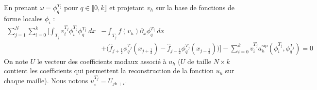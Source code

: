 En prenant $\omega = \phi_q^{T_j}$ pour $q \in \llbracket 0,k \rrbracket$ et projetant $v_h$ sur la base de fonctions de forme locales $\phi_i$ : 
\begin{equation*}
\begin{split}
    \sum_{j=1}^{N}\sum_{i=0}^{k} \bigg[ \int_{T_j} v_i^{T_j} \phi_i^{T_j} \phi_q^{T_j} \ dx &- \int_{T_j} f(v_h) \partial_x \phi_q^{T_j} \ dx  \\
    & + \Big( \widehat{f}_{j+\frac{1}{2}}\phi_q^{T_j}(x_{j + \frac{1}{2}}) - \widehat{f}_{j - \frac{1}{2}} \phi_q^{T_j}(x_{j - \frac{1}{2}}) \Big) \bigg] - \sum_{i=0}^{k} v_i^{T_j}a_h^{\text{sip}} (\phi_i^{T_j} , \phi_q^{T_j} ) = 0
\end{split}
\end{equation*}
On note $U$ le vecteur des coefficients modaux associé à $u_h$ ($U$ de taille $N\times k$ contient les coefficients qui permettent la reconstruction de la fonction $u_h$ sur chaque maille).
Nous notons $u^{T_j}_i = U_{jk + i}$. 
